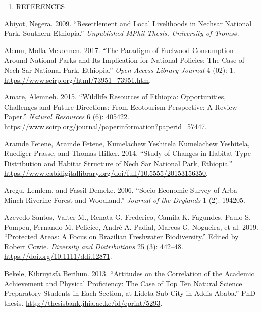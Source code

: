 \documentclass[
  letterpaper,
  DIV=11,
  numbers=noendperiod]{scrartcl}
\providecommand{\tightlist}{%
  \setlength{\itemsep}{0pt}\setlength{\parskip}{0pt}}\usepackage{longtable,booktabs,array}
\newlength{\cslhangindent}
\newenvironment{CSLReferences}[2] %
 {\begin{list}{}{%
  \setlength{\itemindent}{0pt}
  \setlength{\leftmargin}{0pt}
  \setlength{\parsep}{0pt}
  \ifodd #1
   \setlength{\leftmargin}{\cslhangindent}
   \setlength{\itemindent}{-1\cslhangindent}
  \fi
  \setlength{\itemsep}{#2\baselineskip}}}
 {\end{list}}
\begin{document}
\begin{enumerate}
\def\labelenumi{\arabic{enumi}.}
\setcounter{enumi}{4}
\tightlist
\item
  REFERENCES
\end{enumerate}

\label{refs}
\begin{CSLReferences}{1}{0}
Abiyot, Negera. 2009. {``Resettlement and Local Livelihoods in Nechsar
National Park, Southern Ethiopia.''} \emph{Unpublished MPhil Thesis,
University of Tromsø}.

Alemu, Molla Mekonnen. 2017. {``The Paradigm of Fuelwood Consumption
Around National Parks and Its Implication for National Policies: The
Case of Nech Sar National Park, Ethiopia.''} \emph{Open Access Library
Journal} 4 (02): 1. \url{https://www.scirp.org/html/73951_73951.htm}.

Amare, Alemneh. 2015. {``Wildlife Resources of Ethiopia: Opportunities,
Challenges and Future Directions: From Ecotourism Perspective: A Review
Paper.''} \emph{Natural Resources} 6 (6): 405422.
\url{https://www.scirp.org/journal/paperinformation?paperid=57447}.

Aramde Fetene, Aramde Fetene, Kumelachew Yeshitela Kumelachew Yeshitela,
Ruediger Prasse, and Thomas Hilker. 2014. {``Study of Changes in Habitat
Type Distribution and Habitat Structure of Nech Sar National Park,
Ethiopia.''}
\url{https://www.cabidigitallibrary.org/doi/full/10.5555/20153156350}.

Aregu, Lemlem, and Fassil Demeke. 2006. {``Socio-Economic Survey of
Arba-Minch Riverine Forest and Woodland.''} \emph{Journal of the
Drylands} 1 (2): 194205.

Azevedo-Santos, Valter M., Renata G. Frederico, Camila K. Fagundes,
Paulo S. Pompeu, Fernando M. Pelicice, André A. Padial, Marcos G.
Nogueira, et al. 2019. {``Protected Areas: A Focus on Brazilian
Freshwater Biodiversity.''} Edited by Robert Cowie. \emph{Diversity and
Distributions} 25 (3): 442--48. \url{https://doi.org/10.1111/ddi.12871}.

Bekele, Kibruyisfa Berihun. 2013. {``Attitudes on the Correlation of the
Academic Achievement and Physical Proficiency: The Case of Top Ten
Natural Science Preparatory Students in Each Section, at Lideta Sub-City
in Addis Ababa.''} PhD thesis.
\url{http://thesisbank.jhia.ac.ke/id/eprint/5293}.


\end{CSLReferences}
\end{document}
